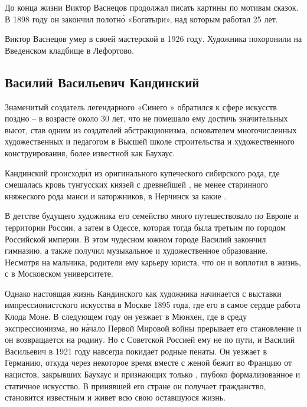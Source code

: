 До конца жизни Виктор Васнецов продолжал писать картины по мотивам сказок. В 1898 году он закончил полотн\'{о} «Богатыри», над которым работал 25 лет.

Виктор Васнецов умер в своей мастерской в 1926 году. Художника похоронили на Введенском кладбище в Лефортово.


\subsection{Василий Васильевич Кандинский}
Знаменитый создатель легендарного «Синего » обратился к сфере искусств  поздно -- в возрасте около 30 лет, что не помешало ему достичь значительных высот, став одним из создателей абстракционизма, основателем многочисленных художественных  и педагогом в Высшей школе строительства и художественного конструирования, более известной как Баухаус.

Кандинский происход\'{и}л из оригинального купеческого сибирского рода, где  смешалась кровь тунгусских князей с древнейшей , не менее старинного княжеского рода манси и каторжников,  в Нерчинск за  какие .

В детстве будущего художника его семейство много путешествовало по Европе и территории России, а затем  в Одессе, которая тогда была третьим по  городом Российской империи. В этом чудесном южном городе Василий закончил гимназию, а также получил музыкальное и художественное образование. Несмотря на   мальчика, родители  ему карьеру юриста, что он и воплотил в жизнь,  с  в Московском университете.

Однако настоящая жизнь Кандинского как художника начинается с выставки импрессионистского искусства в Москве 1895 года, где его в самое сердце  работа Клода Моне.
В следующем году он уезжает в Мюнхен, где  в среду экспрессионизма, но н\'{а}чало Первой Мировой войны прерывает его становление и он возвращается на родину. Но с Советской Россией ему не по пути, и Василий Васильевич в 1921 году навсегда покидает родные пенаты. Он уезжает в Германию, откуда через некоторое время вместе с женой бежит во Францию от нацистов, закрывших Баухаус и признающих только , глубоко формализованное и статичное искусство. В принявшей его стране он получает гражданство, становится известным и живет всю свою оставшуюся жизнь.

